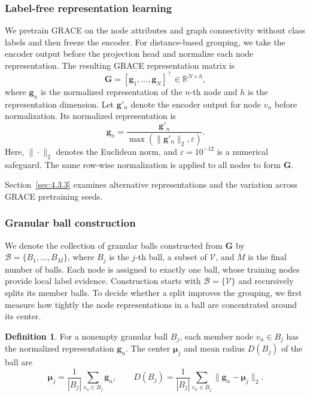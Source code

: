 \documentclass[times,review,10pt]{elsarticle}
\theoremstyle{definition}
\newtheorem{definition}{Definition}
\theoremstyle{plain}
\begin{document}
\subsubsection{Label-free representation learning}\label{sec:3.2.1}

We pretrain GRACE \cite{ref12} on the node attributes and graph connectivity without class labels and then freeze the encoder. For distance-based grouping, we take the encoder output before the projection head and normalize each node representation. The resulting GRACE representation matrix is
\begin{equation}\label{eq:2}
\mathbf G=[\mathbf g_1,\ldots,\mathbf g_N]^\top\in\mathbb R^{N\times h},
\end{equation}
where \(\mathbf g_n\) is the normalized representation of the \(n\)-th node and \(h\) is the representation dimension. Let \(\mathbf g'_n\) denote the encoder output for node \(v_n\) before normalization. Its normalized representation is
\begin{equation}\label{eq:3}
\mathbf g_n=\frac{\mathbf g'_n}{\max(\|\mathbf g'_n\|_2,\varepsilon)}.
\end{equation}
Here, \(\|\cdot\|_2\) denotes the Euclidean norm, and \(\varepsilon=10^{-12}\) is a numerical safeguard. The same row-wise normalization is applied to all nodes to form \(\mathbf G\).

Section~\ref{sec:4.3.3} examines alternative representations and the variation across GRACE pretraining seeds.

\subsubsection{Granular ball construction}\label{sec:3.2.2}

We denote the collection of granular balls constructed from \(\mathbf G\) by \(\mathcal B=\{B_1,\ldots,B_M\}\), where \(B_j\) is the \(j\)-th ball, a subset of \(\mathcal V\), and \(M\) is the final number of balls. Each node is assigned to exactly one ball, whose training nodes provide local label evidence. Construction starts with \(\mathcal B=\{\mathcal V\}\) and recursively splits its member balls. To decide whether a split improves the grouping, we first measure how tightly the node representations in a ball are concentrated around its center.

\begin{definition}
For a nonempty granular ball \(B_j\), each member node \(v_n\in B_j\) has the normalized representation \(\mathbf g_n\). The center \(\boldsymbol\mu_j\) and mean radius \(D(B_j)\) of the ball are
\begin{equation}\label{eq:4}
\boldsymbol\mu_j=\frac{1}{|B_j|}\sum_{v_n\in B_j}\mathbf g_n,
\qquad D(B_j)=\frac{1}{|B_j|}\sum_{v_n\in B_j}\|\mathbf g_n-\boldsymbol\mu_j\|_2.
\end{equation}
\end{definition}
\end{document}
